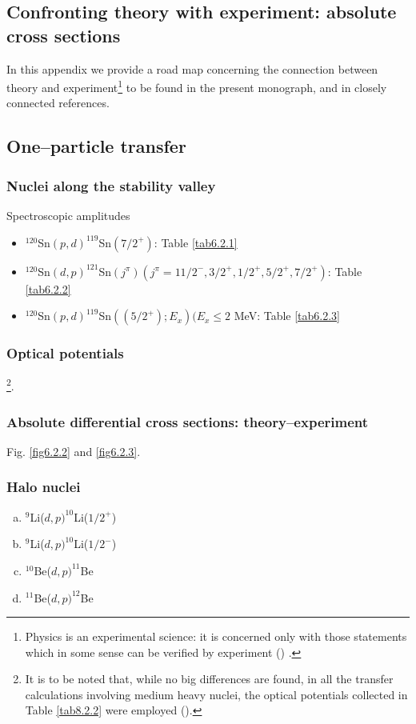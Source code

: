 \begin{subappendices}
\section[Confronting theory with experiment]{Confronting theory with experiment: absolute cross sections}\label{appintroAx}
In this appendix we provide a road map concerning the connection between theory and experiment\footnote{Physics is an experimental science: it is concerned only with those statements which in some sense can be verified by experiment (\cite{Schwinger:01})  .} to be found in the present monograph, and in closely connected references.
\subsection{One--particle transfer}
\subsubsection{Nuclei along the stability valley}
Spectroscopic amplitudes
\begin{itemize}
\item $^{120}$Sn$(p,d)^{119}$Sn$(7/2^+)$: Table \ref{tab6.2.1}
\item $^{120}$Sn$(d,p)^{121}$Sn$(j^\pi)(j^\pi=11/2^-,3/2^+,1/2^+,5/2^+,7/2^+)$: Table \ref{tab6.2.2}
\item $^{120}$Sn$(p,d)^{119}$Sn$((5/2^+);E_x)(E_x\leq 2$ MeV: Table \ref{tab6.2.3}
\end{itemize}
\subsubsection{Optical potentials}
\cite{Dickey:82,Bechara:75}\footnote{It is to be noted that, while no big differences are found, in all the transfer calculations involving medium heavy nuclei, the optical potentials collected in Table \ref{tab8.2.2} were employed (\cite{Potel:13}).}.
\subsubsection{Absolute differential cross sections: theory--experiment}
Fig. \ref{fig6.2.2} and \ref{fig6.2.3}.
\subsubsection{Halo nuclei}
\begin{enumerate}[a)]
\item{$^9$Li($d,p)^{10}$Li($1/2^+$)}
\item{$^9$Li($d,p)^{10}$Li($1/2^-$)}
\item{$^{10}$Be($d,p)^{11}$Be}
\item{$^{11}$Be($d,p)^{12}$Be}
\end{enumerate}

\end{subappendices}
